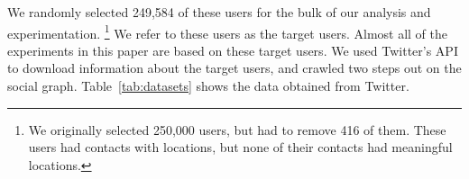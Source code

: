 \documentclass[letterpaper]{article}
\begin{document}


%

We randomly selected 249,584 of these users for the bulk of our analysis and
experimentation.
\ifdefined\THESIS
\footnote{We originally selected 250,000 users, but had to remove 416 of them.
These users had contacts with locations, but none of their contacts had
meaningful locations.}
\fi
%
We refer to these users as the target users.
%
Almost all of the experiments in this paper are based on these target
users.
%
We used Twitter's API to download information about the target users, and
crawled two steps out on the social graph.
%
Table~\ref{tab:datasets} shows the data obtained from Twitter.

\end{document}
